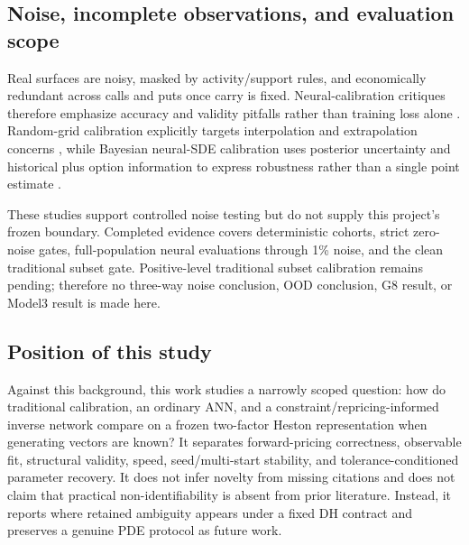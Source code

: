 \subsection{Noise, incomplete observations, and evaluation scope}
\label{subsec:literature-noise-robustness}

Real surfaces are noisy, masked by activity/support rules, and economically redundant
across calls and puts once carry is fixed. Neural-calibration critiques therefore
emphasize accuracy and validity pitfalls rather than training loss alone
\citep{itkin2019deep}. Random-grid calibration explicitly targets interpolation and
extrapolation concerns \citep{baschetti2024deep}, while Bayesian neural-SDE calibration
uses posterior uncertainty and historical plus option information to express robustness
rather than a single point estimate \citep{cuchiero2025robust}.

These studies support controlled noise testing but do not supply this project's frozen
boundary. Completed evidence covers deterministic cohorts, strict zero-noise gates,
full-population neural evaluations through 1\% noise, and the clean traditional subset
gate. Positive-level traditional subset calibration remains pending; therefore no
three-way noise conclusion, OOD conclusion, G8 result, or Model3 result is made here.

\subsection{Position of this study}
\label{subsec:this-work-position}

Against this background, this work studies a narrowly scoped question: how do
traditional calibration, an ordinary ANN, and a constraint/repricing-informed inverse
network compare on a frozen two-factor Heston representation when generating vectors are
known? It separates forward-pricing correctness, observable fit, structural validity,
speed, seed/multi-start stability, and tolerance-conditioned parameter recovery. It does
not infer novelty from missing citations and does not claim that practical
non-identifiability is absent from prior literature. Instead, it reports where retained
ambiguity appears under a fixed DH contract and preserves a genuine PDE protocol as
future work.
